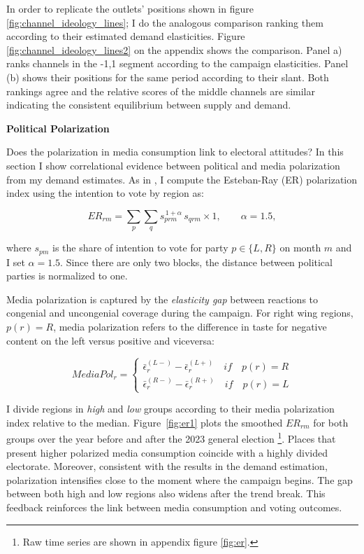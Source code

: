 \documentclass[12pt]{article}
\begin{document}
In order to replicate the outlets' positions shown in figure \ref{fig:channel_ideology_lines}; I do the analogous comparison ranking them according to their estimated demand elasticities. Figure \ref{fig:channel_ideology_lines2} on the appendix shows the comparison. Panel a) ranks channels in the -1,1 segment according to the campaign elasticities. Panel (b) shows their positions for the same period according to their slant. Both rankings agree and the relative scores of the middle channels are similar indicating the consistent equilibrium between supply and demand. 





	\textbf{Political Polarization}

Does the polarization in media consumption link to electoral attitudes?  In this section I show correlational evidence between political and media polarization from my demand estimates. As in \cite{martin2017}, I compute  the Esteban-Ray (ER) polarization index \citep{esteban} using the intention to vote by region as:

\begin{equation}
	ER_{rm}  =	 \sum_{p}   \sum_{q}
	s_{prm}^{\,1+\alpha}\,s_{qrm} \times 1,\qquad \alpha = 1.5,
		\label{eq:er}
\end{equation}

where $s_{pm}$ is the share of intention to vote for party $p\in \{L,R\}$  on month $m$ and I set $\alpha=1.5$. Since there are only two blocks, the distance between political parties is normalized to one. 


Media polarization is captured by the \emph{elasticity gap} between reactions to congenial and uncongenial coverage during the campaign. For right wing regions, $p(r)=R$, media polarization refers to the difference in taste for negative content on the left versus positive and viceversa: 


\begin{equation}
	MediaPol_r  =	\begin{cases}
		\bar{\epsilon}_r^{(L-)}- \bar{\epsilon}_r^{(L+)} \quad if \quad p(r)=R\\
		\bar{\epsilon}_r^{(R-)}- \bar{\epsilon}_r^{(R+)} \quad if \quad p(r)=L
	\end{cases}
		\label{eq:mediapol}
\end{equation}


I divide regions in \textit{high} and \textit{low} groups according to their media polarization index relative to the median. Figure~\ref{fig:er1} plots the smoothed  \(ER_{rm}\)
for both groups over the year before and after the 2023 general election \footnote{Raw time series are shown in appendix figure \ref{fig:er}.}. Places that present higher polarized media consumption coincide with a highly divided electorate. Moreover, consistent with the results in the demand estimation, polarization intensifies close to the moment where the campaign begins. The gap between both high and low regions also widens after the trend break. This feedback reinforces the link between media consumption and voting outcomes. 
\end{document}
